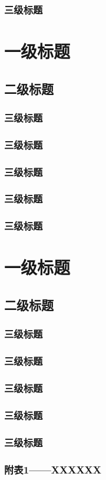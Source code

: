\documentclass[]{article}
\begin{document}
\subsubsection{三级标题}

\section{一级标题}
\subsection{二级标题}
\subsubsection{三级标题}
\subsubsection{三级标题}
\subsubsection{三级标题}
\subsubsection{三级标题}
\subsubsection{三级标题}

\section{一级标题}
\subsection{二级标题}
\subsubsection{三级标题}
\subsubsection{三级标题}
\subsubsection{三级标题}
\subsubsection{三级标题}
\subsubsection{三级标题}
	
	
\appendix 
\renewcommand{\appendixname}{Appendix~\Alph{subsubsection}}
\subsubsection{附表1——XXXXXX}

\begin{thebibliography}{9}%
\end{thebibliography}

%
\end{document}
